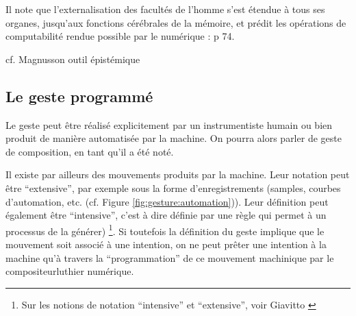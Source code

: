 Il note que l’externalisation des facultés de l’homme s’est étendue à tous ses organes, jusqu'aux fonctions cérébrales de la mémoire, et prédit les opérations de computabilité rendue possible par le numérique :
 \cite{leroi-gourhan_geste_1964} p 74.

cf. Magnusson outil épistémique

\subsection{Le geste programmé}
\label{sec:gesture:instrumental_to_musical:geste_programme}

Le geste peut être réalisé explicitement par un instrumentiste humain ou bien produit de manière automatisée par la machine. On pourra alors parler de geste de composition, en tant qu'il a été noté. 

Il existe par ailleurs des mouvements produits par la machine. Leur notation peut être ``extensive'', par exemple sous la forme d'enregistrements (samples, courbes d'automation, etc. (cf. Figure \ref{fig:gesture:automation})). Leur définition peut également être ``intensive'', c'est à dire définie par une règle qui permet à un processus de la générer) \footnote{Sur les notions de notation ``intensive'' et ``extensive'', voir Giavitto \cite{giavitto_du_2014}}. Si toutefois la définition du geste implique que le mouvement soit associé à une intention, on ne peut prêter une intention à la machine qu'à travers la ``programmation'' de ce mouvement machinique par le compositeur\/luthier numérique.

